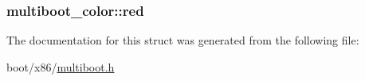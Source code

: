 \subsubsection[{red}]{ multiboot\+\_\+color\+::red}\label{structmultiboot__color_a4c8a91229f40c06c3c63b4c37e83d219}


The documentation for this struct was generated from the following file\+:\begin{DoxyCompactItemize}
\item 
boot/x86/\hyperlink{multiboot_8h}{multiboot.\+h}\end{DoxyCompactItemize}

